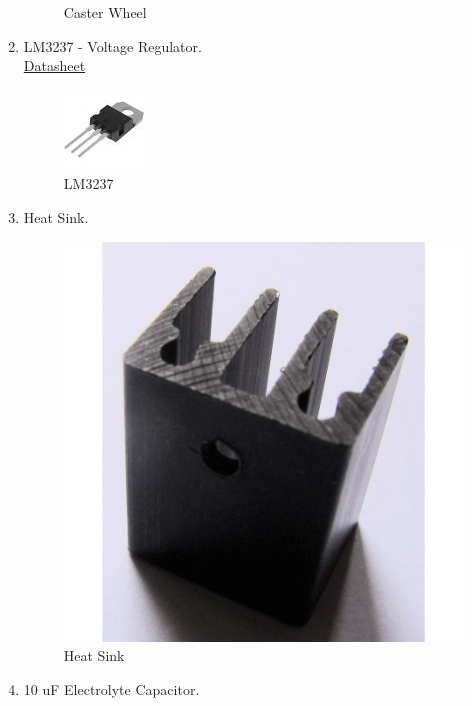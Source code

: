 \documentclass[a4paper,12pt,oneside]{book}
\begin{document}
\begin{enumerate}
\begin{figure}[!ht]
        \caption{Caster Wheel}
      \end{figure}
      \newpage

    \item LM3237 - Voltage Regulator.\\
    \href{http://pdf.datasheetarchive.com/indexerfiles/Datasheet-044/DSA0017815.pdf}{ Datasheet}\par
   \begin{figure}[!ht]
        \centering
        \includegraphics[scale=0.9]{lm}
        \caption{LM3237}
      \end{figure}
    \item Heat Sink.
    \begin{figure}[!ht]
        \centering
        \includegraphics[scale=0.25]{heat}
        \caption{Heat Sink}
      \end{figure}
    \item 10 uF Electrolyte Capacitor.
    \begin{figure}[!ht]
        \centering

\end{figure}
\end{enumerate}
\end{document}
